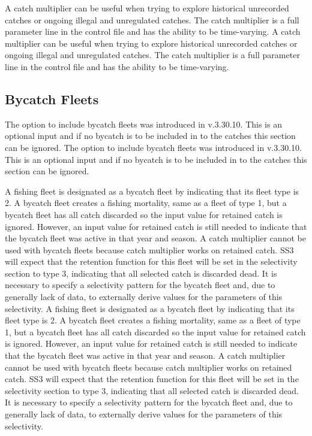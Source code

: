 A catch multiplier can be useful when trying to explore historical unrecorded catches or ongoing illegal and unregulated catches. The catch multiplier is a full parameter line in the control file and has the ability to be time-varying.  
A catch multiplier can be useful when trying to explore historical unrecorded catches or ongoing illegal and unregulated catches. The catch multiplier is a full parameter line in the control file and has the ability to be time-varying.  

\subsection{Bycatch Fleets}
The option to include bycatch fleets was introduced in v.3.30.10. This is an optional input and if no bycatch is to be included in to the catches this section can be ignored.
The option to include bycatch fleets was introduced in v.3.30.10. This is an optional input and if no bycatch is to be included in to the catches this section can be ignored.

A fishing fleet is designated as a bycatch fleet by indicating that its fleet type is 2. A bycatch fleet creates a fishing mortality, same as a fleet of type 1, but a bycatch fleet has all catch discarded so the input value for retained catch is ignored. However, an input value for retained catch is still needed to indicate that the bycatch fleet was active in that year and season. A catch multiplier cannot be used with bycatch fleets because catch multiplier works on retained catch. SS3 will expect that the retention function for this fleet will be set in the selectivity section to type 3, indicating that all selected catch is discarded dead. It is necessary to specify a selectivity pattern for the bycatch fleet and, due to generally lack of data, to externally derive values for the parameters of this selectivity.
A fishing fleet is designated as a bycatch fleet by indicating that its fleet type is 2. A bycatch fleet creates a fishing mortality, same as a fleet of type 1, but a bycatch fleet has all catch discarded so the input value for retained catch is ignored. However, an input value for retained catch is still needed to indicate that the bycatch fleet was active in that year and season. A catch multiplier cannot be used with bycatch fleets because catch multiplier works on retained catch. SS3 will expect that the retention function for this fleet will be set in the selectivity section to type 3, indicating that all selected catch is discarded dead. It is necessary to specify a selectivity pattern for the bycatch fleet and, due to generally lack of data, to externally derive values for the parameters of this selectivity.

